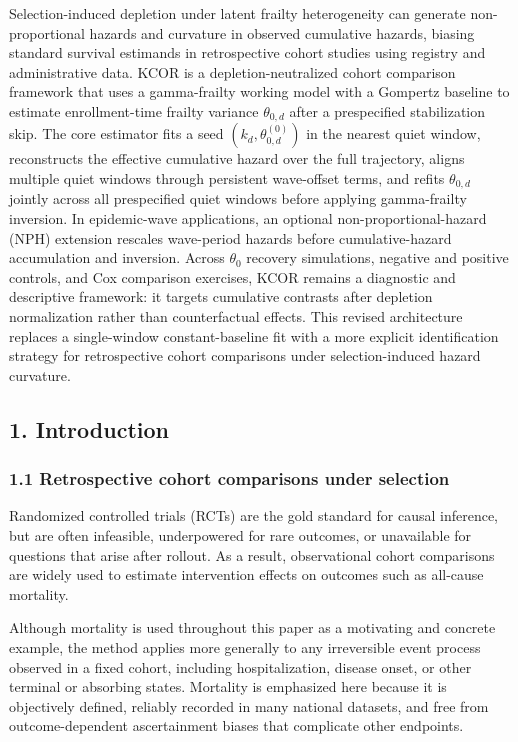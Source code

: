 \documentclass[
]{article}
\begin{document}
Selection-induced depletion under latent frailty heterogeneity can
generate non-proportional hazards and curvature in observed cumulative
hazards, biasing standard survival estimands in retrospective cohort
studies using registry and administrative data. KCOR is a
depletion-neutralized cohort comparison framework that uses a
gamma-frailty working model with a Gompertz baseline to estimate
enrollment-time frailty variance \(\theta_{0,d}\) after a prespecified
stabilization skip. The core estimator fits a seed
\((k_d,\theta_{0,d}^{(0)})\) in the nearest quiet window, reconstructs
the effective cumulative hazard over the full trajectory, aligns
multiple quiet windows through persistent wave-offset terms, and refits
\(\theta_{0,d}\) jointly across all prespecified quiet windows before
applying gamma-frailty inversion. In epidemic-wave applications, an
optional non-proportional-hazard (NPH) extension rescales wave-period
hazards before cumulative-hazard accumulation and inversion. Across
\(\theta_0\) recovery simulations, negative and positive controls, and
Cox comparison exercises, KCOR remains a diagnostic and descriptive
framework: it targets cumulative contrasts after depletion normalization
rather than counterfactual effects. This revised architecture replaces a
single-window constant-baseline fit with a more explicit identification
strategy for retrospective cohort comparisons under selection-induced
hazard curvature.

\subsection{1. Introduction}\label{introduction}

\subsubsection{1.1 Retrospective cohort comparisons under
selection}\label{retrospective-cohort-comparisons-under-selection}

Randomized controlled trials (RCTs) are the gold standard for causal
inference, but are often infeasible, underpowered for rare outcomes, or
unavailable for questions that arise after rollout. As a result,
observational cohort comparisons are widely used to estimate
intervention effects on outcomes such as all-cause mortality.

Although mortality is used throughout this paper as a motivating and
concrete example, the method applies more generally to any irreversible
event process observed in a fixed cohort, including hospitalization,
disease onset, or other terminal or absorbing states. Mortality is
emphasized here because it is objectively defined, reliably recorded in
many national datasets, and free from outcome-dependent ascertainment
biases that complicate other endpoints.
\end{document}
